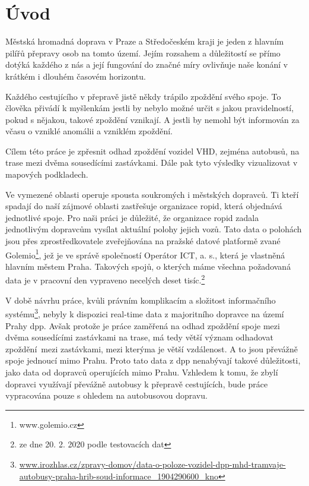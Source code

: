\chapter*{Úvod}

Městská hromadná doprava v Praze a Středočeském kraji je jeden z hlavním pilířů přepravy osob na tomto území. Jejím rozsahem a důležitostí se přímo dotýká každého z nás a její fungování do značné míry ovlivňuje naše konání v krátkém i dlouhém časovém horizontu.

\bigbreak

Každého cestujícího v přepravě jistě někdy trápilo zpoždění svého spoje. To člověka přivádí k myšlenkám jestli by nebylo možné určit s jakou pravidelností, pokud s nějakou, takové zpoždění vznikají. A jestli by nemohl být informován za včasu o vzniklé anomálii a vzniklém zpoždění.

\bigbreak

Cílem této práce je zpřesnit odhad zpoždění vozidel VHD, zejména autobusů, na trase mezi dvěma sousedícími zastávkami. Dále pak tyto výsledky vizualizovat v mapových podkladech.

\bigbreak

Ve vymezené oblasti operuje spousta soukromých i městských dopravců. Ti kteří spadají do naší zájmové oblasti zastřešuje organizace \gls{ropid}, která objednává jednotlivé spoje. Pro naši práci je důležité, že organizace \gls{ropid} zadala jednotlivým dopravcům vysílat aktuální polohy jejich vozů. Tato data o polohách jsou přes zprostředkovatele zveřejňována na pražské datové platformě zvané Golemio\footnote{www.golemio.cz}, jež je ve správě společností Operátor ICT, a. s., která je vlastněná hlavním městem Praha. Takových spojů, o kterých máme všechna požadovaná data je v pracovní den vypraveno necelých deset tisíc.\footnote{ze dne 20. 2. 2020 podle testovacích dat}

\bigbreak

V době návrhu práce, kvůli právním komplikacím a složitost informačního systému\footnote{\url{www.irozhlas.cz/zpravy-domov/data-o-poloze-vozidel-dpp-mhd-tramvaje-autobusy-praha-hrib-soud-informace_1904290600_kno}}, nebyly k dispozici real-time data z majoritního dopravce na území Prahy \gls{dpp}. Avšak protože je práce zaměřená na odhad zpoždění spoje mezi dvěma sousedícími zastávkami na trase, má tedy větší význam odhadovat zpoždění mezi zastávkami, mezi kterýma je větší vzdálenost. A to jsou převážně spoje jednoucí mimo Prahu. Proto tato data z \gls{dpp} nenabývají takové důležitosti, jako data od dopravců operujících mimo Prahu. Vzhledem k tomu, že zbylí dopravci využívají převážně autobusy k přepravě cestujících, bude práce vypracována pouze s ohledem na autobusovou dopravu.


